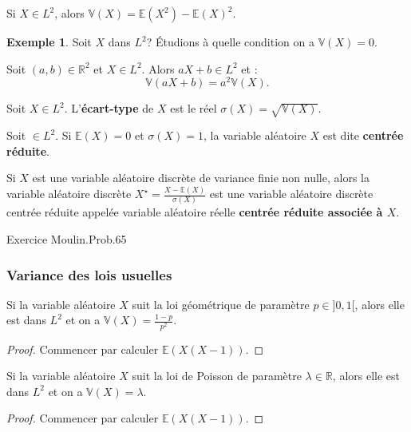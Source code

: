 \documentclass[french]{article}
\newcommand{\R}{\mathbb{R}}
\newcommand{\E}{\mathbb{E}}
\newcommand{\V}{\mathbb{V}}
\theoremstyle{plain}
\theoremstyle{definition}
\newtheorem*{ex}{Exemple}
\theoremstyle{remark}
\begin{document}
\begin{prop}
	Si $X\in L^2$, alors $\V(X)=\E(X^2)-\E(X)^2$.
\end{prop}

\begin{ex}
	Soit $X$ dans $L^2$? Étudions à quelle condition on a $\V(X)=0$.
\end{ex}

\begin{prop}%
	Soit $(a,b)\in\R^2$ et $X\in L^2$. Alors $aX+b\in L^2$ et : $$\V(aX+b)=a^2\V(X).$$
\end{prop}

\begin{dfn}
	Soit $X\in L^2$. L'\textbf{écart-type} de $X$ est le réel $\sigma(X)=\sqrt{\V(X)}$.
\end{dfn}

\begin{dfn}
	Soit $\in L^2$. Si $\E(X)=0$ et $\sigma(X)=1$, la variable aléatoire $X$ est dite \textbf{centrée réduite}.
\end{dfn}

\begin{prop}%
	Si $X$ est une variable aléatoire discrète de variance finie non nulle, alors la variable aléatoire discrète $X^\star=\displaystyle\frac{X-\E(X)}{\sigma(X)}$ est une variable aléatoire discrète centrée réduite appelée variable aléatoire réelle \textbf{centrée réduite associée à $X$}.
\end{prop}

Exercice Moulin.Prob.65

\subsubsection*{Variance des lois usuelles}

\begin{prop}%
	Si la variable aléatoire $X$ suit la loi géométrique de paramètre $p\in]0,1[$, alors elle est dans $L^2$ et on a $\V(X)=\displaystyle\frac{1-p}{p^2}$.
\end{prop}
\begin{proof}
	Commencer par calculer $\E(X(X-1))$.
\end{proof}

\begin{prop}%
	Si la variable aléatoire $X$ suit la loi de Poisson de paramètre $\lambda\in\R$, alors elle est dans $L^2$ et on a $\V(X)=\lambda$.
\end{prop}
\begin{proof}
	Commencer par calculer $\E(X(X-1))$.
\end{proof}
\end{document}
